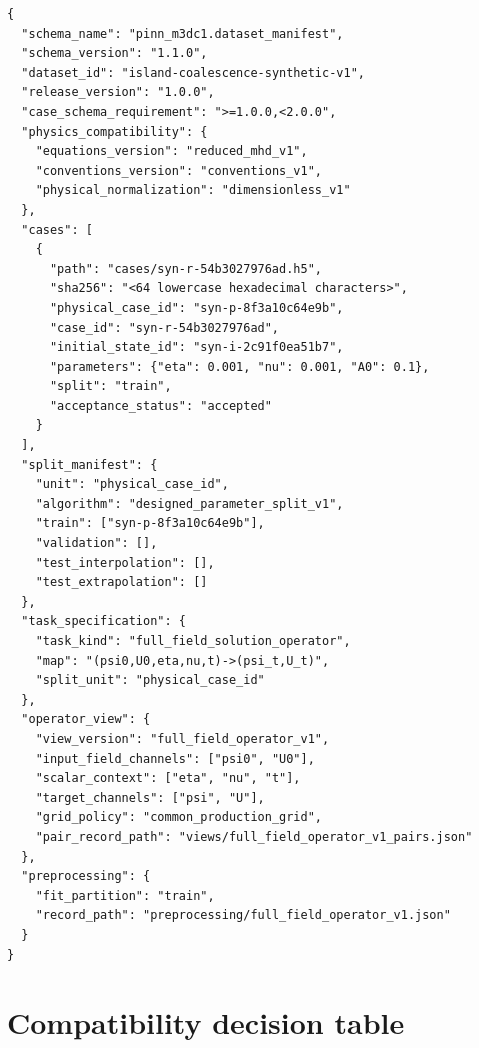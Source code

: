 \documentclass[11pt]{article}
\begin{document}
\begin{verbatim}
{
  "schema_name": "pinn_m3dc1.dataset_manifest",
  "schema_version": "1.1.0",
  "dataset_id": "island-coalescence-synthetic-v1",
  "release_version": "1.0.0",
  "case_schema_requirement": ">=1.0.0,<2.0.0",
  "physics_compatibility": {
    "equations_version": "reduced_mhd_v1",
    "conventions_version": "conventions_v1",
    "physical_normalization": "dimensionless_v1"
  },
  "cases": [
    {
      "path": "cases/syn-r-54b3027976ad.h5",
      "sha256": "<64 lowercase hexadecimal characters>",
      "physical_case_id": "syn-p-8f3a10c64e9b",
      "case_id": "syn-r-54b3027976ad",
      "initial_state_id": "syn-i-2c91f0ea51b7",
      "parameters": {"eta": 0.001, "nu": 0.001, "A0": 0.1},
      "split": "train",
      "acceptance_status": "accepted"
    }
  ],
  "split_manifest": {
    "unit": "physical_case_id",
    "algorithm": "designed_parameter_split_v1",
    "train": ["syn-p-8f3a10c64e9b"],
    "validation": [],
    "test_interpolation": [],
    "test_extrapolation": []
  },
  "task_specification": {
    "task_kind": "full_field_solution_operator",
    "map": "(psi0,U0,eta,nu,t)->(psi_t,U_t)",
    "split_unit": "physical_case_id"
  },
  "operator_view": {
    "view_version": "full_field_operator_v1",
    "input_field_channels": ["psi0", "U0"],
    "scalar_context": ["eta", "nu", "t"],
    "target_channels": ["psi", "U"],
    "grid_policy": "common_production_grid",
    "pair_record_path": "views/full_field_operator_v1_pairs.json"
  },
  "preprocessing": {
    "fit_partition": "train",
    "record_path": "preprocessing/full_field_operator_v1.json"
  }
}
\end{verbatim}

\section{Compatibility decision table}
\label{app:compatibility}
\end{document}
